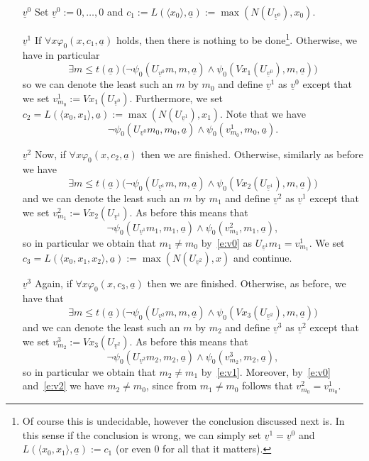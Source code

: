 \documentclass[1p]{elsarticle}
\newcommand{\tup}{\underline} %
\theoremstyle{plain}
\theoremstyle{definition}
\theoremstyle{remark}
\renewenvironment{proof}[1][]{\noindent{\bf Proof{#1}. }}{\nopagebreak[4]{\hspace*{\fill}
  $\Box$              %
 }{\vspace{2ex}}}
\renewcommand{\phi}{\varphi}
\theoremstyle{definition}
\begin{document}
{\begin{proof}
\begin{enumerate}
\item[$\tup v^0$] 
Set $\tup v^0:=0,\ldots,0$ and $c_1:=L(\langle x_0\rangle,\tup a):=\max(N(U_{\tup v^0}),x_0)$.
\item[$\tup v^1$] If $\forall x \phi_0(x,c_1,\tup a)$ holds, then there is nothing to be 
done\footnote{
Of course this is undecidable, however the conclusion discussed next is. In this sense if the conclusion is wrong, 
we can simply set $\tup v^1=\tup v^0$ and $L(\langle x_0,x_1\rangle,\tup a):=c_1$ (or even $0$ for all that it matters).
}. 
Otherwise, we have in particular
\[
\exists m\leq t(\tup a) \big (\neg\psi_0(U_{\tup v^0}m,m,\tup a) \wedge \psi_0(Vx_1(U_{\tup v^0}),m,\tup a)\big)
\]
so we can denote the least such an $m$ by $m_0$ and define $\tup v^1$ as $\tup v^0$ except that we set $v^1_{m_0}:=Vx_1(U_{\tup v^0})$.
Furthermore, we set 
$c_2=L(\langle x_0,x_1\rangle,\tup a):=\max( N(U_{\tup v^1}), x_1 )$. 
Note that we have \[ \neg\psi_0(U_{\tup v^0}m_0,m_0,\tup a) \wedge \psi_0(v^1_{m_0},m_0,\tup a). \tag{v0}\label{e:v0}\]
\item[$\tup v^2$] Now, if $\forall x \phi_0(x,c_2,\tup a)$ then we are finished. Otherwise, similarly as before we have 
\[
\exists m\leq t(\tup a) \big (\neg\psi_0(U_{\tup v^1}m,m,\tup a) \wedge \psi_0(Vx_2(U_{\tup v^1}),m,\tup a)\big)
\]
and we can denote the least such an $m$ by $m_1$ and define $\tup v^2$ as $\tup v^1$ except that we set $v^2_{m_1}:=Vx_2(U_{\tup v^1})$. As before this means that
\[ \neg\psi_0(U_{\tup v^1}m_1,m_1,\tup a) \wedge \psi_0(v^2_{m_1},m_1,\tup a), \tag{v1}\label{e:v1}\]
so in particular we obtain that $m_1\neq m_0$ by~\eqref{e:v0} as $U_{\tup v^1}m_1=v^1_{m_1}$. We set $c_3=L(\langle x_0,x_1,x_2\rangle,\tup a):=\max( N(U_{\tup v^2}), x)$ and continue.
\item[$\tup v^3$] Again, if $\forall x \phi_0(x,c_3,\tup a)$ then we are finished. Otherwise, as before, we have that
\[
\exists m\leq t(\tup a) \big (\neg\psi_0(U_{\tup v^2}m,m,\tup a) \wedge \psi_0(Vx_3(U_{\tup v^2}),m,\tup a)\big)
\]
and we can denote the least such an $m$ by $m_2$ and define $\tup v^3$ as $\tup v^2$ except that we set $v^3_{m_2}:=Vx_3(U_{\tup v^2})$. As before this means that
\[ \neg\psi_0(U_{\tup v^2}m_2,m_2,\tup a) \wedge \psi_0(v^3_{m_2},m_2,\tup a), \tag{v2}\label{e:v2}\]
so in particular we obtain that $m_2\neq m_1$ by~\eqref{e:v1}. Moreover, by~\eqref{e:v0} and~\eqref{e:v2} we have $m_2\neq m_0$, since from $m_1\neq m_0$ follows that $v^2_{m_0}=v^1_{m_0}$.

\end{enumerate}
\end{proof}}
\end{document}
